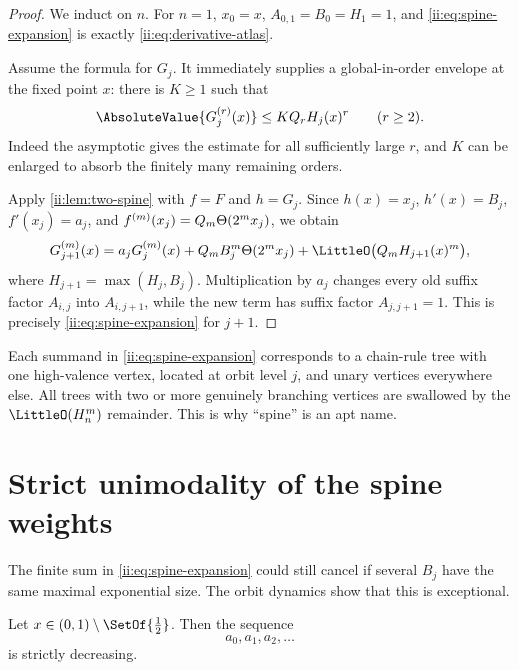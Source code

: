 \begin{proof}
We induct on $n$.  For $n=1$, $x_0=x$, $A_{0,1}=B_0=H_1=1$, and
\eqref{ii:eq:spine-expansion} is exactly \eqref{ii:eq:derivative-atlas}.

Assume the formula for $G_j$.  It immediately supplies a global-in-order envelope at
the fixed point $x$: there is $K\geq1$ such that
\begin{equation}
 \AbsoluteValue{G_j^{(r)}(x)}\leq KQ_rH_j(x)^r\qquad(r\geq2).
 \label{ii:eq:Gj-envelope}
\end{equation}
Indeed the asymptotic gives the estimate for all sufficiently large $r$, and $K$ can
be enlarged to absorb the finitely many remaining orders.

Apply \cref{ii:lem:two-spine} with $f=F$ and $h=G_j$.  Since
$h(x)=x_j$, $h'(x)=B_j$, $f'(x_j)=a_j$, and
$f^{(m)}(x_j)=Q_m\Theta(2^m x_j)$, we obtain
\begin{equation}
 G_{j+1}^{(m)}(x)
 =a_jG_j^{(m)}(x)
  +Q_mB_j^m\ThetaF(2^m x_j)
  +\LittleO\bigl(Q_mH_{j+1}(x)^m\bigr),
 \label{ii:eq:spine-induction-step}
\end{equation}
where $H_{j+1}=\max(H_j,B_j)$.  Multiplication by $a_j$ changes every old suffix
factor $A_{i,j}$ into $A_{i,j+1}$, while the new term has suffix factor
$A_{j,j+1}=1$.  This is precisely \eqref{ii:eq:spine-expansion} for $j+1$.
\end{proof}

\begin{remark}
Each summand in \eqref{ii:eq:spine-expansion} corresponds to a chain-rule tree with one
high-valence vertex, located at orbit level $j$, and unary vertices everywhere else.
All trees with two or more genuinely branching vertices are swallowed by the
$\LittleO(H_n^m)$ remainder.  This is why ``spine'' is an apt name.
\end{remark}

\section{Strict unimodality of the spine weights}
\label{ii:sec:unimodality}

The finite sum in \eqref{ii:eq:spine-expansion} could still cancel if several $B_j$ have
the same maximal exponential size.  The orbit dynamics show that this is exceptional.

\begin{lemma}
\label{ii:lem:decreasing-slopes}
Let $x\in(0,1)\setminus\SetOf{\half}$.  Then the sequence
\begin{equation}
 a_0,a_1,a_2,\ldots
 \label{ii:eq:a-decreasing}
\end{equation}
is strictly decreasing.
\end{lemma}


